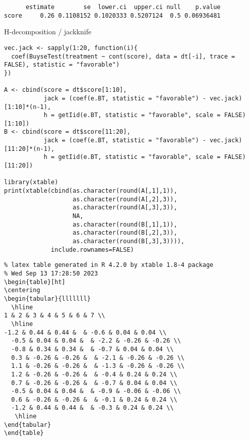 \documentclass[12pt]{article}
\begin{document}
\begin{verbatim}
      estimate        se  lower.ci  upper.ci null    p.value
score     0.26 0.1108152 0.1020333 0.5207124  0.5 0.06936481
\end{verbatim}


H-decomposition / jackknife
\lstset{language=r,label= ,caption= ,captionpos=b,numbers=none}
\begin{lstlisting}
vec.jack <- sapply(1:20, function(i){
  coef(BuyseTest(treatment ~ cont(score), data = dt[-i], trace = FALSE), statistic = "favorable")
})

A <- cbind(score = dt$score[1:10],
           jack = (coef(e.BT, statistic = "favorable") - vec.jack)[1:10]*(n-1),
           h = getIid(e.BT, statistic = "favorable", scale = FALSE)[1:10])
B <- cbind(score = dt$score[11:20],
           jack = (coef(e.BT, statistic = "favorable") - vec.jack)[11:20]*(n-1),
           h = getIid(e.BT, statistic = "favorable", scale = FALSE)[11:20])

library(xtable)
print(xtable(cbind(as.character(round(A[,1],1)),
                   as.character(round(A[,2],3)),
                   as.character(round(A[,3],3)),
                   NA,
                   as.character(round(B[,1],1)),
                   as.character(round(B[,2],3)),
                   as.character(round(B[,3],3)))),
             include.rownames=FALSE)
\end{lstlisting}

\begin{verbatim}
% latex table generated in R 4.2.0 by xtable 1.8-4 package
% Wed Sep 13 17:28:50 2023
\begin{table}[ht]
\centering
\begin{tabular}{lllllll}
  \hline
1 & 2 & 3 & 4 & 5 & 6 & 7 \\ 
  \hline
-1.2 & 0.44 & 0.44 &  & -0.6 & 0.04 & 0.04 \\ 
  -0.5 & 0.04 & 0.04 &  & -2.2 & -0.26 & -0.26 \\ 
  -0.8 & 0.34 & 0.34 &  & -0.7 & 0.04 & 0.04 \\ 
  0.3 & -0.26 & -0.26 &  & -2.1 & -0.26 & -0.26 \\ 
  1.1 & -0.26 & -0.26 &  & -1.3 & -0.26 & -0.26 \\ 
  1.2 & -0.26 & -0.26 &  & -0.4 & 0.24 & 0.24 \\ 
  0.7 & -0.26 & -0.26 &  & -0.7 & 0.04 & 0.04 \\ 
  -0.5 & 0.04 & 0.04 &  & -0.9 & -0.06 & -0.06 \\ 
  0.6 & -0.26 & -0.26 &  & -0.1 & 0.24 & 0.24 \\ 
  -1.2 & 0.44 & 0.44 &  & -0.3 & 0.24 & 0.24 \\ 
   \hline
\end{tabular}
\end{table}
\end{verbatim}
\end{document}
